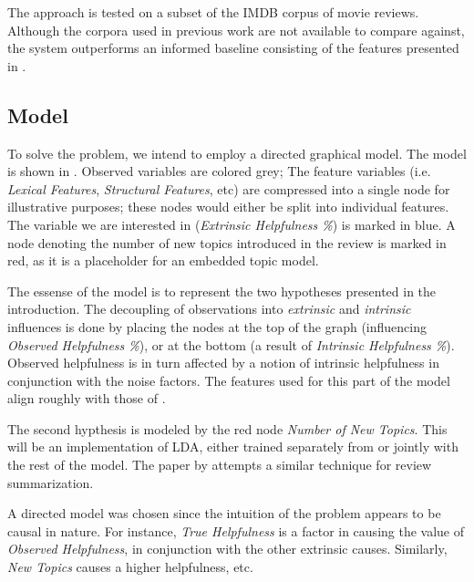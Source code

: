 \documentclass[letter,12pt]{article}
\begin{document}
The approach is tested on a subset of the IMDB corpus of movie reviews.
Although the corpora used in previous work are not available
	to compare against, the system outperforms an informed baseline consisting
	of the features presented in .

\subsection{Model}

To solve the problem, we intend to employ a directed graphical model.
The model is shown in .
Observed variables are colored grey;
The feature variables (i.e. {\em Lexical Features}, {\em Structural Features}, 
	etc) are compressed into a single node for illustrative purposes;
	these nodes would either be split into individual features.
The variable we are interested in ({\em Extrinsic Helpfulness \%}) is marked
	in blue.
A node denoting the number of new topics introduced in the review is marked
	in red, as it is a placeholder for an embedded topic model.

The essense of the model is to represent the two hypotheses presented in the
	introduction. 
The decoupling of observations into {\em extrinsic} and
	{\em intrinsic} influences is done by placing the nodes at the top
	of the graph (influencing {\em Observed Helpfulness \%}), or at the bottom
	(a result of {\em Intrinsic Helpfulness \%}).
Observed helpfulness is in turn affected by a notion of intrinsic helpfulness
	in conjunction with the noise factors.
The features used for this part of the model align roughly with those of
	.

The second hypthesis is modeled by the red node {\em Number of New Topics}.
This will be an implementation of LDA, either trained separately from or
	jointly with the rest of the model.
The paper by  attempts a similar technique
	for review summarization.

A directed model was chosen since the intuition of the problem appears to
	be causal in nature.
For instance, {\em True Helpfulness} is a factor in causing the value of
	{\em Observed Helpfulness}, in conjunction with the other extrinsic
	causes.
Similarly, {\em New Topics} causes a higher helpfulness, etc.
\end{document}
